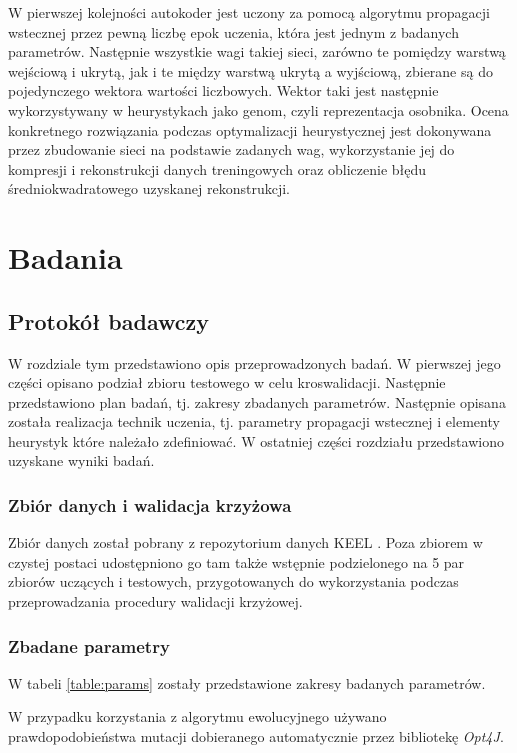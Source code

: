\documentclass[11pt,a4paper,oneside]{report}
\begin{document}
W pierwszej kolejności autokoder jest uczony za pomocą algorytmu propagacji wstecznej przez pewną liczbę epok uczenia, która jest jednym z badanych parametrów. Następnie wszystkie wagi takiej sieci, zarówno te pomiędzy warstwą wejściową i ukrytą, jak i te między warstwą ukrytą a wyjściową, zbierane są do pojedynczego wektora wartości liczbowych. Wektor taki jest następnie wykorzystywany w heurystykach jako genom, czyli reprezentacja osobnika. Ocena konkretnego rozwiązania podczas optymalizacji heurystycznej jest dokonywana przez zbudowanie sieci na podstawie zadanych wag, wykorzystanie jej do kompresji i rekonstrukcji danych treningowych oraz obliczenie błędu średniokwadratowego uzyskanej rekonstrukcji. 

\chapter{Badania}

\section{Protokół badawczy}

W rozdziale tym przedstawiono opis przeprowadzonych badań. W pierwszej jego części opisano podział zbioru testowego w celu kroswalidacji. Następnie przedstawiono plan badań, tj. zakresy zbadanych parametrów. Następnie opisana została realizacja technik uczenia, tj. parametry propagacji wstecznej i elementy heurystyk które należało zdefiniować. W ostatniej części rozdziału przedstawiono uzyskane wyniki badań.

\subsection{Zbiór danych i walidacja krzyżowa}

Zbiór danych został pobrany z repozytorium danych KEEL \cite{alcala2010keel}. Poza zbiorem w czystej postaci udostępniono go tam także wstępnie podzielonego na 5 par zbiorów uczących i testowych, przygotowanych do wykorzystania podczas przeprowadzania procedury walidacji krzyżowej.

\subsection{Zbadane parametry}

W tabeli \ref{table:params} zostały przedstawione zakresy badanych parametrów.

W przypadku korzystania z algorytmu ewolucyjnego używano prawdopodobieństwa mutacji dobieranego automatycznie przez bibliotekę \emph{Opt4J}.
\end{document}
